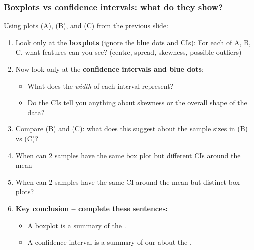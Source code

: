 \documentclass[t,8pt]{beamer}
\begin{document}
\begin{frame}
	\frametitle{Boxplots vs confidence intervals: what do they show?}
	
	\small
	Using plots (A), (B), and (C) from the previous slide:
	
	\begin{enumerate}[(1)]
		\item Look only at the \textbf{boxplots} (ignore the blue dots and CIs): 
		For each of A, B, C, what features can you see?
		(centre, spread, skewness, possible outliers)
		
		\item Now look only at the \textbf{confidence intervals and blue dots}:
		\begin{itemize}
			\item What does the \emph{width} of each interval represent?
			\item Do the CIs tell you anything about skewness or the overall shape
			of the data?
		\end{itemize}
		
		\item Compare (B) and (C): what does this suggest about the sample sizes in (B) vs (C)?
		
		\item When can 2 samples have the same box plot but different CIs around the mean
		
		\item When can 2 samples have the same CI around the mean but distinct box plots?
		
		\item \textbf{Key conclusion – complete these sentences:}
		\begin{itemize}
			\item A boxplot is a summary of the \underline{\hspace{2cm}}.
			\item A confidence interval is a summary of our \underline{\hspace{3cm}}
			about the \underline{\hspace{2cm}}.
		\end{itemize}
	\end{enumerate}
	
	
\end{frame}
\end{document}
